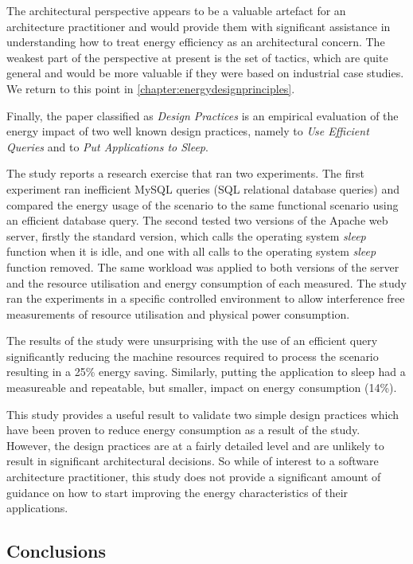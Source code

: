 The architectural perspective appears to be a valuable artefact for an architecture practitioner and would provide them with significant assistance in understanding how to treat energy efficiency as an architectural concern.  The weakest part of the perspective at present is the set of tactics, which are quite general and would be more valuable if they were based on industrial case studies.  We return to this point in \cref{chapter:energydesignprinciples}.

Finally, the paper classified as \emph{Design Practices} is an empirical evaluation of the energy impact of two well known design practices, namely to \emph{Use Efficient Queries} and to \emph{Put Applications to Sleep}.  

The study reports a research exercise that ran two experiments.  The first experiment ran inefficient MySQL queries (SQL relational database queries) and compared the energy usage of the scenario to the same functional scenario using an efficient database query.  The second tested two versions of the Apache web server, firstly the standard version, which calls the operating system \emph{sleep} function when it is idle, and one with all calls to the operating system \emph{sleep} function removed.  The same workload was applied to both versions of the server and the resource utilisation and energy consumption of each measured.  The study ran the experiments in a specific controlled environment to allow interference free measurements of resource utilisation and physical power consumption.

The results of the study were unsurprising with the use of an efficient query significantly reducing the machine resources required to process the scenario resulting in a 25\% energy saving.  Similarly, putting the application to sleep had a measureable and repeatable, but smaller, impact on energy consumption (14\%).

This study provides a useful result to validate two simple design practices which have been proven to reduce energy consumption as a result of the study.  However, the design practices are at a fairly detailed level and are unlikely to result in significant architectural decisions.  So while of interest to a software architecture practitioner, this study does not provide a significant amount of guidance on how to start improving the energy characteristics of their applications.

\subsection{Conclusions}

